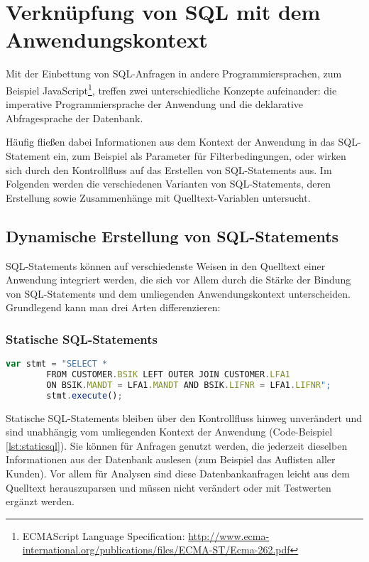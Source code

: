 \section{Verkn{\"u}pfung von SQL mit dem Anwendungskontext}\label{sec:dependencydetection}

%
%

Mit der Einbettung von SQL-Anfragen in andere Programmiersprachen, zum Beispiel JavaScript\footnote{ECMAScript Language 
Specification: \url{http://www.ecma-international.org/publications/files/ECMA-ST/Ecma-262.pdf}}, treffen zwei unterschiedliche Konzepte aufeinander: die imperative Programmiersprache der Anwendung und die deklarative Abfragesprache der Datenbank.

Häufig fließen dabei Informationen aus dem Kontext der Anwendung in das SQL-Statement ein, zum Beispiel als Parameter für Filterbedingungen, oder wirken sich durch den Kontrollfluss auf das Erstellen von SQL-Statements aus.
Im Folgenden werden die verschiedenen Varianten von SQL-Statements, deren Erstellung sowie Zusammenhänge mit Quelltext-Variablen untersucht.

\subsection{Dynamische Erstellung von SQL-Statements}
SQL-Statements können auf verschiedenste Weisen in den Quelltext einer Anwendung integriert werden, die sich vor Allem durch die Stärke der Bindung von SQL-Statements und dem umliegenden Anwendungskontext unterscheiden.
Grundlegend kann man drei Arten differenzieren:

\subsubsection{Statische SQL-Statements}

	\begin{lstlisting}[caption={Statisches Statement eingebettet im Quelltext}, label={lst:staticsql}, language=JavaScript]
		var stmt = "SELECT *
		FROM CUSTOMER.BSIK LEFT OUTER JOIN CUSTOMER.LFA1
		ON BSIK.MANDT = LFA1.MANDT AND BSIK.LIFNR = LFA1.LIFNR";
		stmt.execute();
	\end{lstlisting}

Statische SQL-Statements bleiben über den Kontrollfluss hinweg unverändert und sind unabhängig vom umliegenden Kontext der Anwendung (Code-Beispiel \ref{lst:staticsql}).
Sie können für Anfragen genutzt werden, die jederzeit dieselben Informationen aus der Datenbank auslesen (zum Beispiel das Auflisten aller Kunden).
Vor allem für Analysen sind diese Datenbankanfragen leicht aus dem Quelltext herauszuparsen und müssen nicht verändert oder mit Testwerten ergänzt werden.

